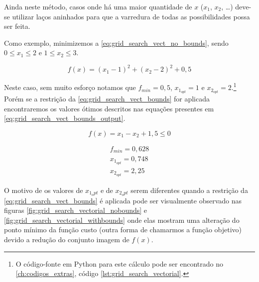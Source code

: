 Ainda neste método, casos onde há uma maior quantidade de $x$ ($x_1$, $x_2$, \dots)
deve-se utilizar laços aninhados para que a varredura de todas as possibilidades
possa ser feita. 

Como exemplo, minimizemos a \cref{eq:grid_search_vect_no_bounds}, sendo
$0 \leq x_1 \leq 2$ e $1 \leq x_2 \leq 3$.

\begin{equation}
	\label{eq:grid_search_vect_no_bounds}
	f(x) = (x_1 - 1)^2 + (x_2 - 2)^2 + 0,5
\end{equation}

Neste caso, sem muito esforço notamos que
$f_{min} = 0,5$, $x_{1_{opt}} = 1$ e $x_{2_{opt}} = 2$.\footnote{
	O código-fonte em Python para este cálculo pode ser encontrado no
	\cref{ch:codigos_extras}, código \ref{lst:grid_search_vectorial}.}
Porém se a restrição da \cref{eq:grid_search_vect_bounds} for aplicada
encontraremos os valores ótimos descritos nas equações presentes em
\cref{eq:grid_search_vect_bounds_output}.

\begin{equation}
	\label{eq:grid_search_vect_bounds}
	f(x) = x_1 - x_2 + 1,5 \leq 0
\end{equation}


\begin{equation}
	\label{eq:grid_search_vect_bounds_output}
	\begin{aligned}
		f_{min} = 0,628 \\
		x_{1_{opt}} = 0,748 \\
		x_{2_{opt}} = 2,25
	\end{aligned}
\end{equation}

O motivo de os valores de $x_{1_opt}$ e de $x_{2_opt}$ serem diferentes quando a restrição
da \cref{eq:grid_search_vect_bounds} é aplicada pode ser visualmente observado nas figuras
\ref{fig:grid_search_vectorial_nobounds} e \ref{fig:grid_search_vectorial_withbounds} onde
elas mostram uma alteração do ponto mínimo da função custo (outra forma de chamarmos a função
objetivo) devido a redução do conjunto imagem de $f(x)$.

